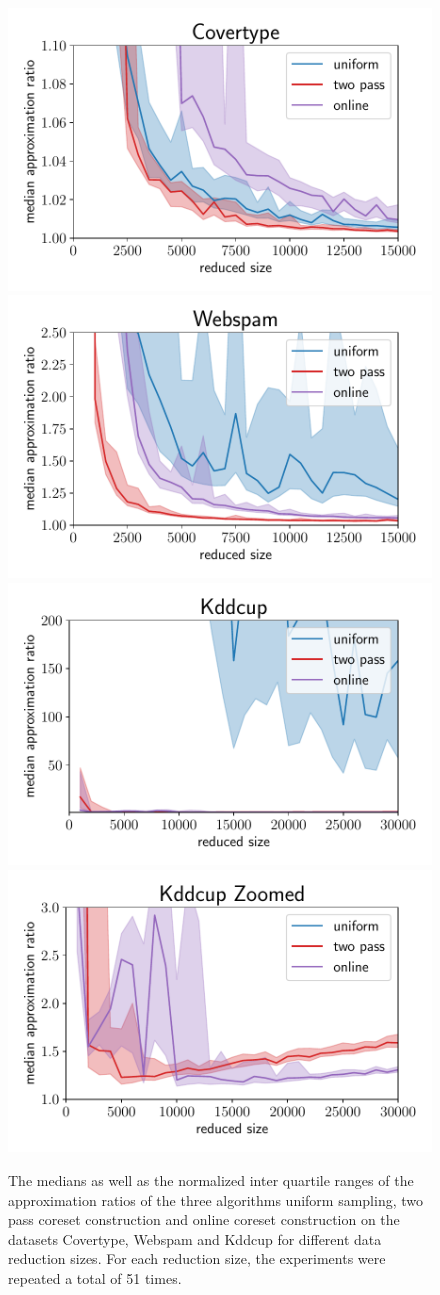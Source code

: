 \begin{figure}[ht!]
    \centering
    \includegraphics[width=.49\linewidth]{figures/covertype_ratio_plot.pdf}
    \includegraphics[width=.49\linewidth]{figures/webspam_ratio_plot.pdf}
    \includegraphics[width=.49\linewidth]{figures/kddcup_ratio_plot.pdf}
    \includegraphics[width=.49\linewidth]{figures/kddcup_ratio_plot_zoomed.pdf}
    \caption{The medians as well as the normalized inter quartile
        ranges of the approximation ratios of the three
        algorithms uniform sampling, two pass coreset construction and
        online coreset construction on the datasets Covertype, Webspam
        and Kddcup for different data reduction sizes.
        For each reduction size, the experiments were repeated a
        total of 51 times.}
    \label{fig:ratio-plots}
\end{figure}

